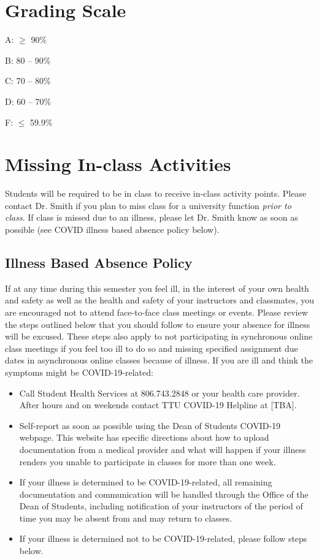 \documentclass[12pt, notitlepage]{article}   	%
\begin{document}
{\section{Grading Scale}
A: $\geq$ 90\% \par
B: 80 – 90\% \par
C: 70 – 80\% \par
D: 60 – 70\% \par
F: $\leq$ 59.9\% \par

\section{Missing In-class Activities}
Students will be required to be in class to receive in-class activity points. 
Please contact Dr. Smith if you plan to miss class for a university function 
\textit{prior to class}. If class is missed due to an illness, 
please let Dr. Smith know as soon as possible (see COVID illness based absence policy below).

\subsection{Illness Based Absence Policy}
If at any time during this semester you feel ill, in the interest of your own health and 
safety as well as the health and safety of your instructors and classmates, you are 
encouraged not to attend face-to-face class meetings or events.  Please review the steps 
outlined below that you should follow to ensure your absence for illness will be excused. 
These steps also apply to not participating in synchronous online class meetings if you feel 
too ill to do so and missing specified assignment due dates in asynchronous online classes 
because of illness. If you are ill and think the symptoms might be COVID-19-related:
\begin{itemize}
	\item{Call Student Health Services at 806.743.2848 or your health care provider.  
	After hours and on weekends contact TTU COVID-19 Helpline at [TBA].}
	\item{Self-report as soon as possible using the Dean of Students COVID-19 webpage.
	This website has specific directions about how to upload documentation from a medical 
	provider and what will happen if your illness renders you unable to participate in 
	classes for more than one week.}
	\item{If your illness is determined to be COVID-19-related, all remaining 
	documentation and communication will be handled through the Office of the 
	Dean of Students, including notification of your instructors of the period of 
	time you may be absent from and may return to classes.}
	\item{If your illness is determined not to be COVID-19-related, please follow steps below.}
\end{itemize}

}
\end{document}
